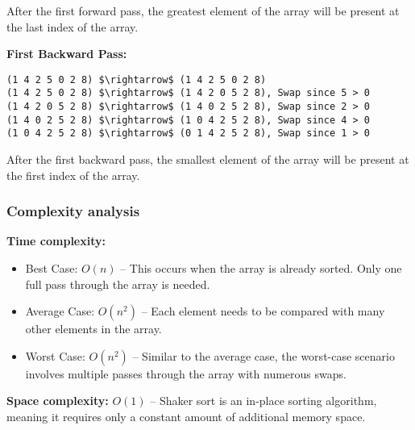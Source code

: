 After the first forward pass, the greatest element of the array will be present at the last index of the array.

\vspace{10pt}

\textbf{First Backward Pass:}

\begin{lstlisting}[mathescape=true]
(1 4 2 5 0 2 8) $\rightarrow$ (1 4 2 5 0 2 8)
(1 4 2 5 0 2 8) $\rightarrow$ (1 4 2 0 5 2 8), Swap since 5 > 0
(1 4 2 0 5 2 8) $\rightarrow$ (1 4 0 2 5 2 8), Swap since 2 > 0
(1 4 0 2 5 2 8) $\rightarrow$ (1 0 4 2 5 2 8), Swap since 4 > 0
(1 0 4 2 5 2 8) $\rightarrow$ (0 1 4 2 5 2 8), Swap since 1 > 0
\end{lstlisting}

After the first backward pass, the smallest element of the array will be present at the first index of the array.

\subsubsection{Complexity analysis}

\textbf{Time complexity:}
\begin{itemize}
    \item Best Case: $O(n)$ – This occurs when the array is already sorted. Only one full pass through the array is needed.
    \item Average Case: $O(n^2)$ – Each element needs to be compared with many other elements in the array.
    \item Worst Case: $O(n^2)$ – Similar to the average case, the worst-case scenario involves multiple passes through the array with numerous swaps.
\end{itemize}

\textbf{Space complexity:} $O(1)$ – Shaker sort is an in-place sorting algorithm, meaning it requires only a constant amount of additional memory space.

\vspace{10pt}
